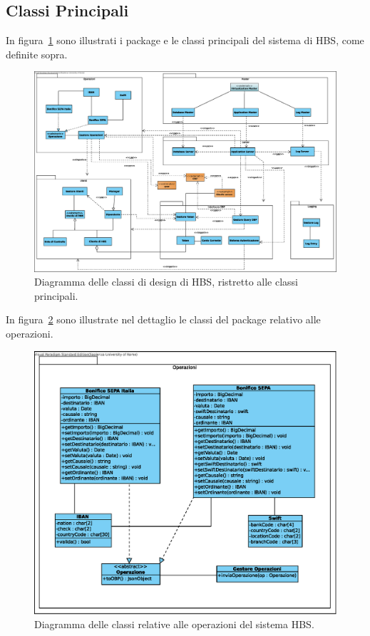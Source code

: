 
\subsection{Classi Principali}

In figura~\ref{fig:classi-principali} sono illustrati i package e le classi principali del sistema di HBS, come definite sopra.

\begin{figure}[h]
    \centering
    \includegraphics[width=\textheight, angle=90]{Images/Classi_Design.eps}
    \caption{Diagramma delle classi di design di HBS, ristretto alle classi principali.}
    \label{fig:classi-principali}
\end{figure}

In figura~\ref{fig:classi-principali:operazioni} sono illustrate nel dettaglio le classi del package relativo alle operazioni.

\begin{figure}[h]
    \centering
    \includegraphics[width=\textwidth]{Images/Operazioni_Design.eps}
    \caption{Diagramma delle classi relative alle operazioni del sistema HBS.}
    \label{fig:classi-principali:operazioni}
\end{figure}

